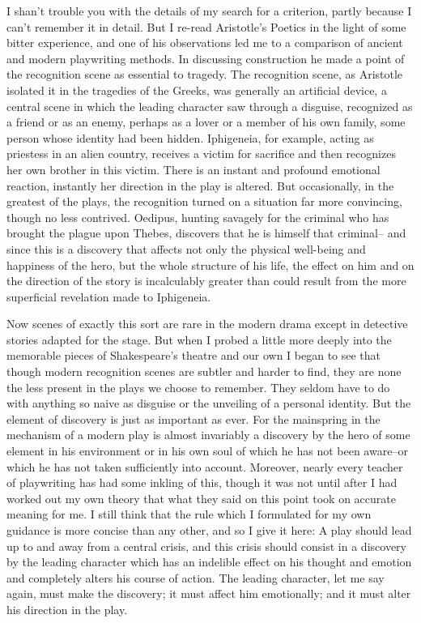 \documentclass[9pt,twoside]{extarticle}
\begin{document}
I shan't trouble you with the details of my search for a criterion, partly because I can't remember it in detail. But I re-read Aristotle's Poetics in the light of some bitter experience, and one of his observations led me to a comparison of ancient and modern playwriting methods. In discussing construction he made a point of the recognition scene as essential to tragedy. The recognition scene, as Aristotle isolated it in the tragedies of the Greeks, was generally an artificial device, a central scene in which the leading character saw through a disguise, recognized as a friend or as an enemy, perhaps as a lover or a member of his own family, some person whose identity had been hidden. Iphigeneia, for example, acting as priestess in an alien country, receives a victim for sacrifice and then recognizes her own brother in this victim. There is an instant and profound emotional reaction, instantly her direction in the play is altered. But occasionally, in the greatest of the plays, the recognition turned on a situation far more convincing, though no less contrived. Oedipus, hunting savagely for the criminal who has brought the plague upon Thebes, discovers that he is himself that criminal-- and since this is a discovery that affects not only the physical well-being and happiness of the hero, but the whole structure of his life, the effect on him and on the direction of the story is incalculably greater than could result from the more superficial revelation made to Iphigeneia.

Now scenes of exactly this sort are rare in the modern drama except in detective stories adapted for the stage. But when I probed a little more deeply into the memorable pieces of Shakespeare's theatre and our own I began to see that though modern recognition scenes are subtler and harder to find, they are none the less present in the plays we choose to remember. They seldom have to do with anything so naive as disguise or the unveiling of a personal identity. But the element of discovery is just as important as ever. For the mainspring in the mechanism of a modern play is almost invariably a discovery by the hero of some element in his environment or in his own soul of which he has not been aware--or which he has not taken sufficiently into account. Moreover, nearly every teacher of playwriting has had some inkling of this, though it was not until after I had worked out my own theory that what they said on this point took on accurate meaning for me. I still think that the rule which I formulated for my own guidance is more concise than any other, and so I give it here: A play should lead up to and away from a central crisis, and this crisis should consist in a discovery by the leading character which has an indelible effect on his thought and emotion and completely alters his course of action. The leading character, let me say again, must make the discovery; it must affect him emotionally; and it must alter his direction in the play.
\end{document}
